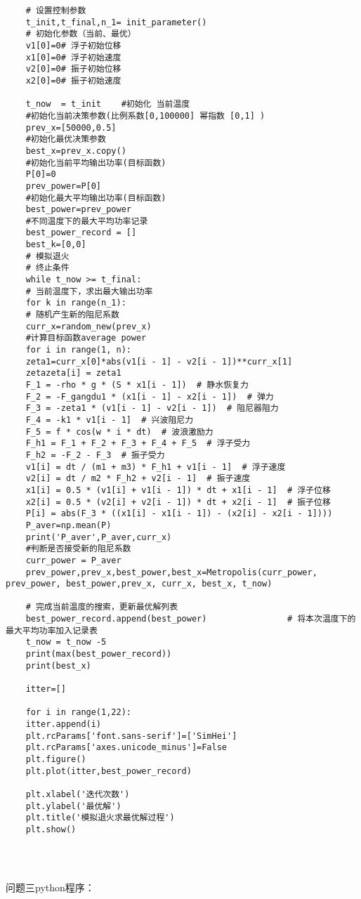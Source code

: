 \documentclass[a4paper,12pt]{article}
\begin{document}
\begin{lstlisting}
	# 设置控制参数
	t_init,t_final,n_1= init_parameter()
	# 初始化参数（当前、最优）
	v1[0]=0# 浮子初始位移
	x1[0]=0# 浮子初始速度
	v2[0]=0# 振子初始位移
	x2[0]=0# 振子初始速度
	
	t_now  = t_init    #初始化 当前温度
	#初始化当前决策参数(比例系数[0,100000] 幂指数 [0,1] )
	prev_x=[50000,0.5]
	#初始化最优决策参数
	best_x=prev_x.copy()
	#初始化当前平均输出功率(目标函数)
	P[0]=0
	prev_power=P[0]
	#初始化最大平均输出功率(目标函数)
	best_power=prev_power
	#不同温度下的最大平均功率记录
	best_power_record = []
	best_k=[0,0]
	# 模拟退火
	# 终止条件
	while t_now >= t_final:
	# 当前温度下，求出最大输出功率
	for k in range(n_1):
	# 随机产生新的阻尼系数
	curr_x=random_new(prev_x)
	#计算目标函数average power
	for i in range(1, n):
	zeta1=curr_x[0]*abs(v1[i - 1] - v2[i - 1])**curr_x[1]
	zetazeta[i] = zeta1
	F_1 = -rho * g * (S * x1[i - 1])  # 静水恢复力
	F_2 = -F_gangdu1 * (x1[i - 1] - x2[i - 1])  # 弹力
	F_3 = -zeta1 * (v1[i - 1] - v2[i - 1])  # 阻尼器阻力
	F_4 = -k1 * v1[i - 1]  # 兴波阻尼力
	F_5 = f * cos(w * i * dt)  # 波浪激励力
	F_h1 = F_1 + F_2 + F_3 + F_4 + F_5  # 浮子受力
	F_h2 = -F_2 - F_3  # 振子受力
	v1[i] = dt / (m1 + m3) * F_h1 + v1[i - 1]  # 浮子速度
	v2[i] = dt / m2 * F_h2 + v2[i - 1]  # 振子速度
	x1[i] = 0.5 * (v1[i] + v1[i - 1]) * dt + x1[i - 1]  # 浮子位移
	x2[i] = 0.5 * (v2[i] + v2[i - 1]) * dt + x2[i - 1]  # 振子位移
	P[i] = abs(F_3 * ((x1[i] - x1[i - 1]) - (x2[i] - x2[i - 1])))
	P_aver=np.mean(P)
	print('P_aver',P_aver,curr_x)
	#判断是否接受新的阻尼系数
	curr_power = P_aver
	prev_power,prev_x,best_power,best_x=Metropolis(curr_power, prev_power, best_power,prev_x, curr_x, best_x, t_now)
	
	# 完成当前温度的搜索，更新最优解列表
	best_power_record.append(best_power)                # 将本次温度下的最大平均功率加入记录表
	t_now = t_now -5
	print(max(best_power_record))
	print(best_x)
	
	itter=[]
	
	for i in range(1,22):
	itter.append(i)
	plt.rcParams['font.sans-serif']=['SimHei']
	plt.rcParams['axes.unicode_minus']=False
	plt.figure()
	plt.plot(itter,best_power_record)
	
	plt.xlabel('迭代次数')
	plt.ylabel('最优解')
	plt.title('模拟退火求最优解过程')
	plt.show()
	
	
		
	\end{lstlisting}
	问题三python程序：
\end{document}
